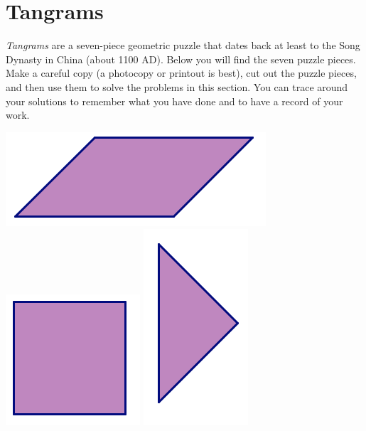 \bigskip
\bigskip

\newpage

\section{Tangrams}

\emph{Tangrams} are a seven-piece geometric puzzle that dates back at least to the Song Dynasty in China (about 1100 AD).  Below you will find the seven puzzle pieces.  Make a careful copy (a photocopy or printout is best), cut out the puzzle pieces, and then use them to solve the problems in this section.  You can trace around your solutions to remember what you have done and to have a record of your work.

\begin{center}
\includegraphics[scale = .470]{parallelogram}
\hfill
\includegraphics[scale = .470]{square}
\hfill
\includegraphics[scale = .470]{smtri}

\bigskip
\bigskip
\bigskip



\end{center}
